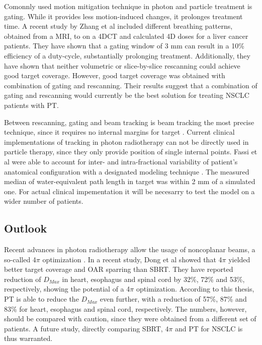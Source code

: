 \documentclass[type=dr, dr=rernat, accentcolor=tud7b,colorbacktitle, bigchapter, openright, twoside, 12pt ]{tudthesis}
\begin{document}
Comonnly used motion mitigation technique in photon and particle treatment is gating. While it provides less motion-induced changes, it prolonges treatment time. A recent study by Zhang et al \cite{Zhang2015} included 
different breathing patterns, obtained from a MRI, to on a 4DCT and calculated 4D doses for a liver cancer patients. They have shown that a gating window of 3 mm can result in a 10\% efficiency of a duty-cycle, 
substantially prolonging treatment. Additionally, they have shown that neither volumetric or slice-by-slice rescanning could achieve good target coverage. However, good target coverage was obtained with combination
of gating and rescanning. Their results suggest that a combination of gating and rescanning would currently be the best solution for treating NSCLC patients with PT.

Between rescanning, gating and beam tracking is beam tracking the most precise technique, since it requires no internal margins for target \cite{Bert2011}. Current clinical implementations
of tracking in photon radiotherapy \cite{Kilby2010, Keall2014} can not be directly used in particle therapy, since they only provide position of single internal points. Fassi et al 
\cite{Fassi2015} were able to account for inter- and intra-fractional variability of patient's anatomical configuration with a designated modeling technique \cite{Fassi2014}.
The measured median of water-equivalent path length in target was within 2 mm of a simulated one. For actual clinical impementation it will be necesarry to test the model
on a wider number of patients.


\subsection{Outlook}

Recent advances in photon radiotherapy allow the usage of noncoplanar beams, a so-called 4$\pi$ optimization \cite{Dong2013}. In a recent study, Dong et al \cite{Dong2013b} showed that
4$\pi$ yielded better target coverage and OAR sparring than SBRT. They have reported reduction of $D_{Max}$ in heart, esophagus and spinal cord by 32\%, 72\% and 53\%, respectively, showing
the potential of a 4$\pi$ optimization. According to this thesis, PT is able to reduce the $D_{Max}$ even further, with a reduction of 57\%, 87\% and 83\% for heart, esophagus and spinal cord,
respectively. The numbers, however, should be compared with caution, since they were obtained from a different set of patients. 
A future study, directly comparing SBRT, $4\pi$ and PT for NSCLC is thus warranted.
\end{document}

